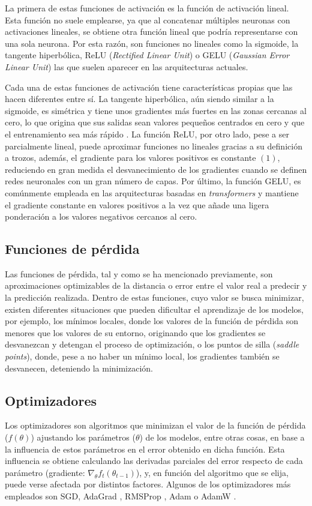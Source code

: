 La primera de estas funciones de activación es la función de activación lineal. Esta función no suele emplearse, ya que al concatenar múltiples neuronas con activaciones lineales, se obtiene otra función lineal que podría representarse con una sola neurona. Por esta razón, son funciones no lineales como la sigmoide, la tangente hiperbólica, ReLU (\textit{Rectified Linear Unit}) \cite{relu} o GELU (\textit{Gaussian Error Linear Unit}) \cite{gelu} las que suelen aparecer en las arquitecturas actuales. 

Cada una de estas funciones de activación tiene características propias que las hacen diferentes entre sí. La tangente hiperbólica, aún siendo similar a la sigmoide, es simétrica y tiene unos gradientes más fuertes en las zonas cercanas al cero, lo que origina que sus salidas sean valores pequeños centrados en cero y que el entrenamiento sea más rápido \cite{lecun2012efficient}. La función ReLU, por otro lado, pese a ser parcialmente lineal, puede aproximar funciones no lineales gracias a su definición a trozos, además, el gradiente para los valores positivos es constante $(1)$, reduciendo en gran medida el desvanecimiento de los gradientes cuando se definen redes neuronales con un gran número de capas. Por último, la función GELU, es comúnmente empleada en las arquitecturas basadas en \textit{transformers} y mantiene el gradiente constante en valores positivos a la vez que añade una ligera ponderación a los valores negativos cercanos al cero.

\subsection{Funciones de pérdida}
Las funciones de pérdida, tal y como se ha mencionado previamente, son aproximaciones optimizables de la distancia o error entre el valor real a predecir y la predicción realizada. Dentro de estas funciones, cuyo valor se busca minimizar, existen diferentes situaciones que pueden dificultar el aprendizaje de los modelos, por ejemplo, los mínimos locales, donde los valores de la función de pérdida son menores que los valores de su entorno, originando que los gradientes se desvanezcan y detengan el proceso de optimización, o los puntos de silla (\textit{saddle points}), donde, pese a no haber un mínimo local, los gradientes también se desvanecen, deteniendo la minimización.

\subsection{Optimizadores}
Los optimizadores son algoritmos que minimizan el valor de la función de pérdida ($f(\theta)$) ajustando los parámetros ($\theta$) de los modelos, entre otras cosas, en base a la influencia de estos parámetros en el error obtenido en dicha función. Esta influencia se obtiene calculando las derivadas parciales del error respecto de cada parámetro (gradiente: $\nabla_{\theta} f_t(\theta_{t-1})$), y, en función del algoritmo que se elija, puede verse afectada por distintos factores. Algunos de los optimizadores más empleados son SGD, AdaGrad \cite{adagrad}, RMSProp \cite{rmsprop}, Adam \cite{adam} o AdamW \cite{adamw}.

